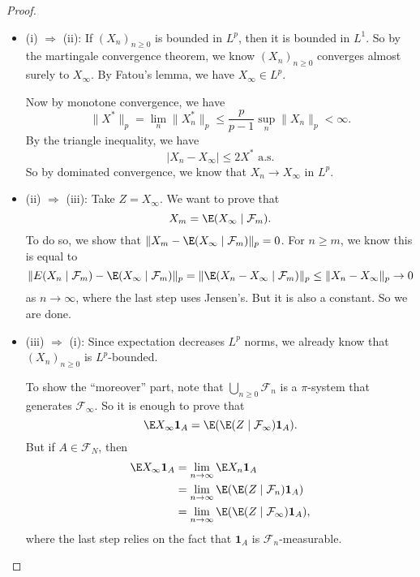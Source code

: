 \documentclass[a4paper]{article}
\begin{document}
\begin{proof}\leavevmode
  \begin{itemize}
    \item (i) $\Rightarrow$ (ii): If $(X_n)_{n \geq 0}$ is bounded in $L^p$, then it is bounded in $L^1$. So by the martingale convergence theorem, we know $(X_n)_{n \geq 0}$ converges almost surely to $X_\infty$. By Fatou's lemma, we have $X_\infty \in L^p$.

      Now by monotone convergence, we have
      \[
        \|X^*\|_p = \lim_n \|X_n^*\|_p \leq \frac{p}{p - 1} \sup_n \|X_n\|_p < \infty.
      \]
      By the triangle inequality, we have
      \[
        |X_n - X_\infty| \leq 2 X^*\text{ a.s.}
      \]
      So by dominated convergence, we know that $X_n \to X_\infty$ in $L^p$.
    \item (ii) $\Rightarrow$ (iii): Take $Z = X_\infty$. We want to prove that
      \[
        X_m = \E(X_\infty \mid \mathcal{F}_m).
      \]
      To do so, we show that $\|X_m - \E(X_\infty \mid \mathcal{F}_m)\|_p = 0$. For $n \geq m$, we know this is equal to
      \[
        \|E(X_n \mid \mathcal{F}_m) - \E(X_\infty \mid \mathcal{F}_m)\|_p = \|\E(X_n - X_\infty \mid \mathcal{F}_m)\|_p \leq \|X_n - X_\infty\|_p \to 0
      \]
      as $n \to \infty$, where the last step uses Jensen's. But it is also a constant. So we are done.
    \item (iii) $\Rightarrow$ (i): Since expectation decreases $L^p$ norms, we already know that $(X_n)_{n \geq 0}$ is $L^p$-bounded.

      To show the ``moreover'' part, note that $\bigcup_{n \geq 0} \mathcal{F}_n$ is a $\pi$-system that generates $\mathcal{F}_\infty$. So it is enough to prove that
      \[
        \E X_\infty \mathbf{1}_A = \E(\E(Z \mid \mathcal{F}_\infty) \mathbf{1}_A).
      \]
      But if $A \in \mathcal{F}_N$, then
      \begin{align*}
        \E X_\infty \mathbf{1}_A &= \lim_{n \to \infty} \E X_n \mathbf{1}_A\\
        &= \lim_{n \to \infty} \E(\E(Z \mid \mathcal{F}_n) \mathbf{1}_A)\\
        &= \lim_{n \to \infty} \E (\E(Z \mid \mathcal{F}_\infty)\mathbf{1}_A),
      \end{align*}
      where the last step relies on the fact that $\mathbf{1}_A$ is $\mathcal{F}_n$-measurable.
  \end{itemize}
\end{proof}
\end{document}
